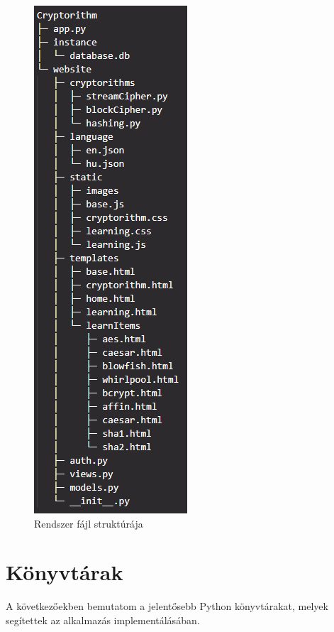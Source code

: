 \begin{figure}[!h]
	\centering
	\includegraphics[scale=0.9]{images/fájlStruktúra}
	\caption{Rendszer fájl struktúrája}
	\label{fig:fileStruct}
\end{figure}

\section {Könyvtárak}
A következőekben bemutatom a jelentősebb Python könyvtárakat, melyek segítettek az alkalmazás implementálásában.

